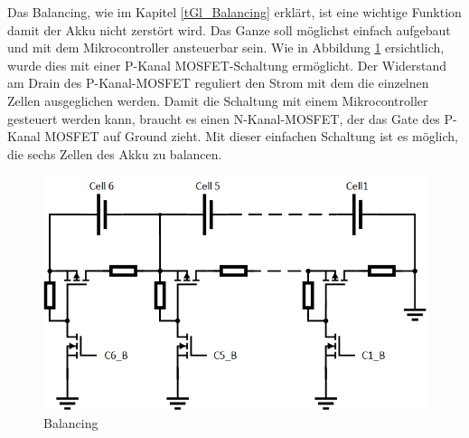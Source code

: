 Das Balancing, wie im Kapitel \ref{tGl_Balancing} erklärt, ist eine wichtige Funktion damit der Akku nicht zerstört wird. Das Ganze soll möglichst einfach aufgebaut und mit dem Mikrocontroller ansteuerbar sein. Wie in Abbildung \ref{fig:Balancing} ersichtlich, wurde dies mit einer P-Kanal MOSFET-Schaltung ermöglicht. Der Widerstand am Drain des P-Kanal-MOSFET reguliert den Strom mit dem die einzelnen Zellen ausgeglichen werden. Damit die Schaltung mit einem Mikrocontroller gesteuert werden kann, braucht es einen N-Kanal-MOSFET, der das Gate des P-Kanal MOSFET auf Ground zieht. Mit dieser einfachen Schaltung ist es möglich, die sechs Zellen des Akku zu balancen.

\begin{figure} [H]
	\centering
	\includegraphics[width=0.6\linewidth]{images/Balancing}
	\caption{Balancing}
	\label{fig:Balancing}
\end{figure}


